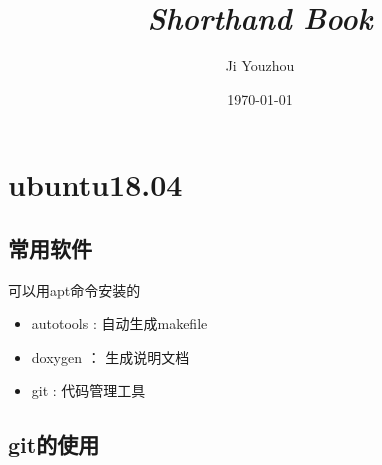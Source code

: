 \documentclass[12pt,twoside]{report}
\begin{document}
\title{\itshape{Shorthand Book}}
\author{Ji Youzhou}
\date{\today}
\maketitle
\thispagestyle{empty}
\newpage

\tableofcontents
\setcounter{page}{1}
\newpage

\chapter{ubuntu18.04}
\setcounter{page}{1}
\section{常用软件}
可以用apt命令安装的
\begin{leftbar}
    \begin{itemize}
        \item autotools : 自动生成makefile
        \item doxygen ： 生成说明文档
        \item git : 代码管理工具
    \end{itemize}
\end{leftbar}

\section{git的使用}
\end{document}
